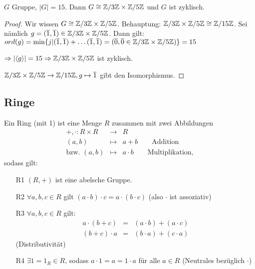 \documentclass[12pt,a4paper]{scrartcl}
\begin{document}
\begin{kor}
	$G$ Gruppe, $|G| = 15$. Dann $G\cong \mathbb Z/3\mathbb Z\times \mathbb Z/5\mathbb Z$ und $G$ ist zyklisch.
\end{kor}

\begin{proof}
	Wir wissen $G \cong \mathbb Z/3\mathbb Z\times \mathbb Z/5\mathbb Z$. Behauptung: $ \mathbb Z/3\mathbb Z\times \mathbb Z/5\mathbb Z\cong \mathbb Z/15\mathbb Z$. Sei nämlich $g = (\overline{1}, \overline{1})\in  \mathbb Z/3\mathbb Z\times \mathbb Z/5\mathbb Z$. Dann gilt: $ord(g) = \min \{j|(\overline{1},\overline{1})+\dots (\overline{1},\overline{1}) = (\overline{0}, \overline{0}\in  \mathbb Z/3\mathbb Z\times \mathbb Z/5\mathbb Z)\}  =15$
	
	$\Rightarrow |\langle g\rangle| = 15 \Rightarrow  \mathbb Z/3\mathbb Z\times \mathbb Z/5\mathbb Z$ ist zyklisch.
	
	$ \mathbb Z/3\mathbb Z\times \mathbb Z/5\mathbb Z\to \mathbb Z/15\mathbb Z, g\mapsto \overline{1}$ gibt den Isomorphismus.
\end{proof}


\subsection{Ringe}
\begin{defi} Ein Ring (mit 1) ist eine Menge $R$ zusammen mit zwei Abbildungen
	\begin{eqnarray*}
		+,\cdot \colon R\times R &\to & R\\
		(a,b)&\mapsto& a+b \qquad \text{Addition}\\
		\text{bzw. }(a,b)&\mapsto& a\cdot b\qquad\text{Multiplikation,}
	\end{eqnarray*}
sodass gilt:
\begin{itemize}
	\item[R1] $(R,+)$ ist eine abelsche Gruppe.
	\item[R2] $\forall a,b,c\in R$ gilt $(a\cdot b)\cdot c = a\cdot (b\cdot c)$ (also $\cdot$ ist assoziativ)
	\item[R3] $\forall a,b,c\in R$ gilt:
	\begin{eqnarray*}
		a\cdot(b+c) &=& (a\cdot b)+ (a\cdot c)\\
		(b+c)\cdot a& =& (b\cdot a)+(c\cdot a)
	\end{eqnarray*} (Distributivität)
	\item[R4] $\exists 1 = 1_R\in R$, sodass $a\cdot 1 = a = 1\cdot a$ für alle $a\in R$ (Neutrales bezüglich $\cdot$)
\end{itemize}
\end{defi}
\end{document}
